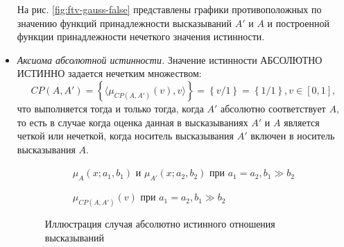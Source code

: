 \begin{itemize}
На рис. \cref{fig:ftv-gauss-false} представлены графики противоположных по значению функций принадлежности высказываний $A'$ и $A$ и построенной функции принадлежности нечеткого значения истинности.
\item \textit{Аксиома абсолютной истинности.}  Значение истинности АБСОЛЮТНО ИСТИННО задается нечетким множеством:
\begin{equation*}
CP(A, A') = \left\{\langle\mu_{CP(A, A')}(v), v\rangle\right\} = \left\{v/1\right\} = \left\{1/1\right\}, v \in [0, 1],
\end{equation*}
что выполняется тогда и только тогда, когда $A'$ абсолютно соответствует $A$, то есть в случае когда оценка данная в высказываниях $A'$ и $A$ является четкой или нечеткой, когда носитель высказывания $A'$ включен в носитель высказывания $A$.

\begin{figure}[ht]
	\newcommand{\aOne}{0.5}
	\newcommand{\bOne}{0.05}
	\newcommand{\aTwo}{0.5}
	\newcommand{\bTwo}{0.05}
	\begin{subfigure}[t]{0.5\textwidth}
		\caption{$\mu_A(x; a_1, b_1)$ и $\mu_{A'}(x; a_2, b_2)$ при $a_1 = a_2, b_1 \gg b_2$}
	\end{subfigure}
	\begin{subfigure}[t]{0.5\textwidth}
		\caption{$\mu_{CP(A,A')}(v)$ при $a_1 = a_2, b_1 \gg b_2$}
	\end{subfigure}
	\caption{Иллюстрация случая абсолютно истинного отношения высказываний}
	\label{fig:ftv-gauss-absolute-true}
\end{figure}


\end{itemize}
